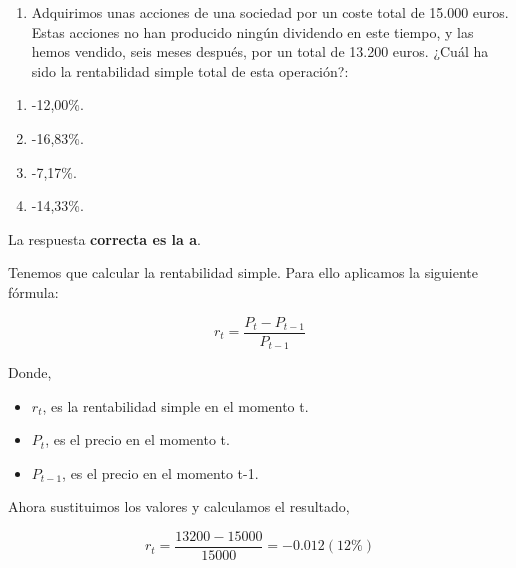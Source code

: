 \documentclass[
  letterpaper,
  DIV=11,
  numbers=noendperiod]{scrreprt}
\providecommand{\tightlist}{%
  \setlength{\itemsep}{0pt}\setlength{\parskip}{0pt}}\usepackage{longtable,booktabs,array}
\begin{document}
\begin{enumerate}
\def\labelenumi{\arabic{enumi}.}
\setcounter{enumi}{74}
\tightlist
\item
  Adquirimos unas acciones de una sociedad por un coste total de 15.000
  euros. Estas acciones no han producido ningún dividendo en este
  tiempo, y las hemos vendido, seis meses después, por un total de
  13.200 euros. ¿Cuál ha sido la rentabilidad simple total de esta
  operación?:
\end{enumerate}

\begin{enumerate}
\def\labelenumi{\alph{enumi})}
\item
  -12,00\%.
\item
  -16,83\%.
\item
  -7,17\%.
\item
  -14,33\%.
\end{enumerate}

\begin{tcolorbox}[enhanced jigsaw, left=2mm, opacityback=0, colback=white, breakable, arc=.35mm, bottomrule=.15mm, rightrule=.15mm, toprule=.15mm, leftrule=.75mm, colframe=quarto-callout-tip-color-frame]
\begin{minipage}[t]{5.5mm}
\textcolor{quarto-callout-tip-color}{\faLightbulb}
\end{minipage}%
\begin{minipage}[t]{\textwidth - 5.5mm}

La respuesta \textbf{correcta es la a}.

Tenemos que calcular la rentabilidad simple. Para ello aplicamos la
siguiente fórmula:

\[r_t=\frac{P_t-P_{t-1}}{P_{t-1}}\]

Donde,

\begin{itemize}
\item
  \(r_t\), es la rentabilidad simple en el momento t.
\item
  \(P_t\), es el precio en el momento t.
\item
  \(P_{t-1}\), es el precio en el momento t-1.
\end{itemize}

Ahora sustituimos los valores y calculamos el resultado,

\[r_t=\frac{13200-15000}{15000}=-0.012(12\%)\]

\end{minipage}%
\end{tcolorbox}
\end{document}
